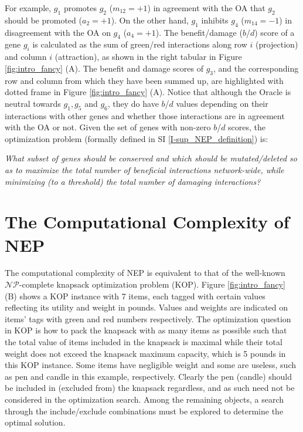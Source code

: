 \documentclass[12pt]{article}
\newcommand{\myC}[1]{{$\mathcal{#1}$}}
\begin{document}
For example, $g_1$ promotes  $g_2$ ($m_{12}=+1$) in agreement with the OA that $g_2$ should be promoted ($a_2=+1$). On the other hand, $g_1$ inhibits  $g_4$ ($m_{14}=-1$) in disagreement with the OA on $g_4$ ($a_4=+1$). The benefit/damage ($b$/$d$) score of a gene $g_i$ is calculated as the sum of green/red interactions along row $i$ (projection) and column $i$ (attraction), as shown in the right tabular in Figure \ref{fig:intro_fancy} (A). The benefit and damage scores of $g_3$, and the corresponding row and column from which they have been summed up, are highlighted with dotted frame in Figure \ref{fig:intro_fancy} (A). Notice that although the Oracle is neutral towards $g_1,g_5$ and $g_6$, they do have $b$/$d$ values depending on their interactions with other genes and whether those interactions are in agreement with the OA or not. Given the set of genes with non-zero $b$/$d$ scores, the optimization problem (formally defined in SI \ref{I-sup_NEP_definition}) is:

\textit{What subset of genes should be conserved and which should be mutated/deleted so as to maximize  the total number of beneficial interactions network-wide, while minimizing (to a threshold) the total number of damaging interactions?}


\section{The Computational Complexity of NEP}
The computational complexity of NEP is equivalent to that of the well-known \myC{NP}-complete knapsack optimization problem (KOP). Figure \ref{fig:intro_fancy} (B) shows a KOP instance with 7 items, each tagged with certain values reflecting its utility and weight in pounds. Values and weights are indicated on items' tags with green and red numbers respectively. The optimization question in KOP is how to pack the knapsack with as many items as possible such that the total value of items included in the knapsack is maximal while their total weight does not exceed the knapsack maximum capacity, which is 5 pounds in this KOP instance. Some items have negligible weight and some are useless, such as pen and candle in this example, respectively. Clearly the pen (candle) should be included in (excluded from) the knapsack regardless, and as such need not be considered in the optimization search. Among the remaining objects, a search through the include/exclude combinations must be explored to determine the optimal solution.
\end{document}
